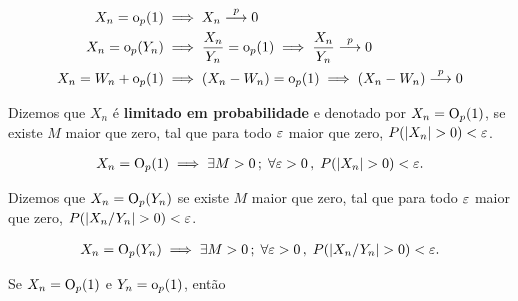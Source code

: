 \documentclass[11pt, oneside, a4paper, article]{article}
\numberwithin{equation}{section}
\begin{document}
\begin{description}
\begin{defn}[$\litop$]
	\vspace{-1 em}
	\begin{align*}
		X_{n} = \text{o}_{p}(1) & \implies X_{n}  \overset{p}{\longrightarrow}  0
		\\
		X_{n} = \text{o}_{p}(Y_{n}) & \implies
		\frac{X_{n}}{Y_{n}} = \text{o}_{p}(1) \implies
		\frac{X_{n}}{Y_{n}}  \overset{p}{\longrightarrow}  0
		\\
		X_{n} = W_{n} + \text{o}_{p}(1) & \implies
		(X_{n} - W_{n}) = \text{o}_{p}(1) \implies
		(X_{n} - W_{n})  \overset{p}{\longrightarrow}  0
	\end{align*}
\end{defn}

\begin{defn}
	\citet[Def 3.3 (3), p.36 ]{wool-2010}

	Dizemos que $X_{n}$ é \textbf{limitado em probabilidade} e denotado por 
	$X_{n} = \text{O}_{p}(1)$,
	se existe $M$ maior que zero, tal que para todo $\varepsilon$ maior que zero, $P( | X_{n} | > 0) < \varepsilon$.

	\vspace{-1 em}
	\begin{align*}
		X_{n} = \text{O}_{p}(1) \implies \exists M > 0 \, ; \;
		\forall \varepsilon > 0 \, , \;
		P( | X_{n} | > 0) < \varepsilon.
	\end{align*}
\end{defn}

\begin{defn}
	\citet[Def 3.4, p.36]{wool-2010}

	Dizemos que
	$X_{n} = \text{O}_{p}(Y_{n})$ se existe $M$ maior que zero, tal que para todo $\varepsilon$ maior que zero, $P( | X_{n}/Y_{n} | > 0) < \varepsilon$.

	\vspace{-1 em}
	\begin{align*}
		X_{n} = \text{O}_{p}(Y_{n}) \implies \exists M > 0 \, ; \;
		\forall \varepsilon > 0 \, , \;
		P( | X_{n}/Y_{n} | > 0) < \varepsilon.
	\end{align*}
\end{defn}

\begin{lem}
	\citet[Lemma 3.2, p.36]{wool-2010}

	Se
	$X_{n} = \text{O}_{p}(1)$ e $Y_{n} = \text{o}_{p}(1)$, então


\end{lem}
\end{description}
\end{document}
